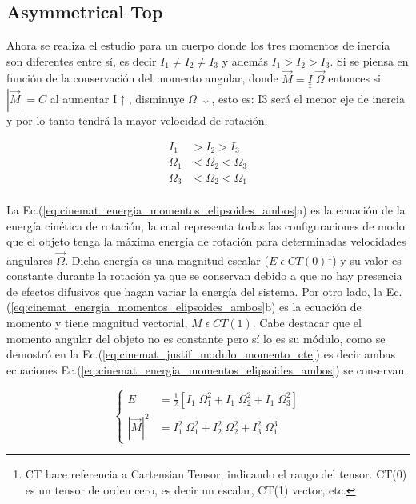 \documentclass[oneside,a4paper,english,links]{amca}
\begin{document}
\subsection{Asymmetrical Top}
\label{sec:cinemat_asymmetrical_top_precesion}

Ahora se realiza el estudio para un cuerpo donde los tres momentos de inercia son diferentes entre s\'i, es decir $I_1\neq I_2\neq I_3$ y adem\'as $I_1>I_2>I_3$. Si se piensa en funci\'on de la conservaci\'on del momento angular, donde $\vec{M}=\underline{\underline{I}}\;
\vec{\Omega}$ entonces si $|\vec{M}|=C$ al aumentar I$\uparrow$, disminuye $\Omega\;\downarrow$, esto es: I3 ser\'a el menor eje de inercia y por lo tanto tendr\'a la mayor velocidad de rotaci\'on.

\begin{equation}
   \begin{split}    I_1&>I_2>I_3\\
   \Omega_1&<\Omega_2<\Omega_3\\
   \Omega_3&<\Omega_2<\Omega_1\\
   \end{split}
    \label{eq:cinemat_relacion_inercias_vel_angulares}
\end{equation}


La Ec.(\ref{eq:cinemat_energia_momentos_elipsoides_ambos}a) es la ecuaci\'on de la energ\'ia cin\'etica de rotaci\'on, la cual representa todas las configuraciones de modo que el objeto tenga la m\'axima energ\'ia de rotaci\'on para determinadas velocidades angulares $\vec{\Omega}$. Dicha energ\'ia es una magnitud escalar ($E\;\epsilon\; CT(0)$\footnote{CT hace referencia a Cartensian Tensor, indicando el rango del tensor. CT(0) es un tensor de orden cero, es decir un escalar, CT(1) vector, etc.}) y su valor es constante durante la rotaci\'on ya que se conservan debido a que no hay presencia de efectos difusivos que hagan variar la energ\'ia del sistema. Por otro lado, la Ec.(\ref{eq:cinemat_energia_momentos_elipsoides_ambos}b) es la ecuaci\'on de momento y tiene magnitud vectorial, $M\;\epsilon\;CT(1)$. Cabe destacar que el momento angular del objeto no es constante pero s\'i lo es su m\'odulo, como se demostr\'o en la Ec.(\ref{eq:cinemat_justif_modulo_momento_cte}) es decir ambas ecuaciones Ec.(\ref{eq:cinemat_energia_momentos_elipsoides_ambos}) se conservan. 

\begin{equation}
    \begin{cases}
       E&=\frac{1}{2}\left[I_1\;\Omega_1^2+I_1\;\Omega_2^2+I_1\;\Omega_3^2  \right]\\  |\vec{M}|^2&=I_1^2\;\Omega_1^2+I_2^2\;\Omega_2^2+I_3^2\;\Omega_1^3  
    \end{cases}
    \label{eq:cinemat_energia_momentos_elipsoides_ambos}
\end{equation}
\end{document}
